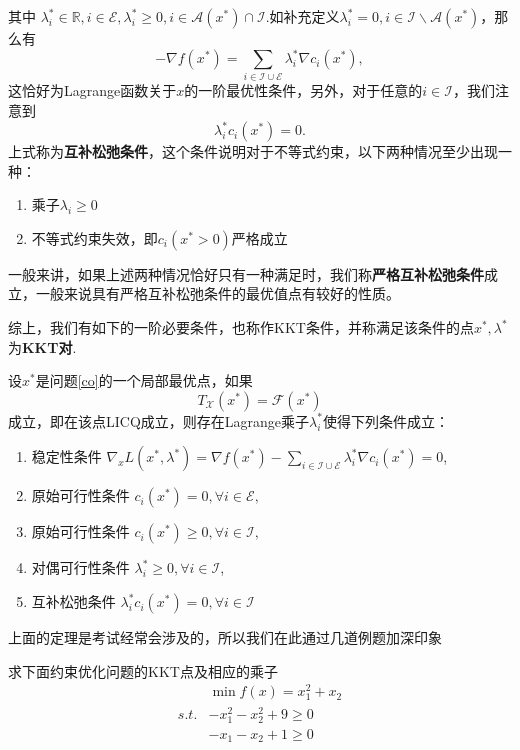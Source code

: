 其中 $\lambda_i^*\in\mathbb{R}, i\in \mathcal{E},\lambda_i^*\geq 0, i\in \mathcal{A}(x^*)\cap\mathcal{I}$.如补充定义$\lambda_i^*=0,i\in \mathcal{I}\backslash\mathcal{A}(x^*)$，那么有
\begin{equation*}
	-\nabla f(x^*) = \sum\limits_{i\in\mathcal{I}\cup\mathcal{E}}\lambda_i^*\nabla c_i(x^*),
\end{equation*}
这恰好为Lagrange函数关于$x$的一阶最优性条件，另外，对于任意的$i\in \mathcal{I}$，我们注意到
\begin{equation*}
	\lambda_i^*c_i(x^*) = 0.
\end{equation*}
上式称为\textbf{互补松弛条件}，这个条件说明对于不等式约束，以下两种情况至少出现一种：
\begin{enumerate}
	\item 乘子$\lambda_i\geq 0$
	\item 不等式约束失效，即$c_i(x^*>0)$严格成立
\end{enumerate}
一般来讲，如果上述两种情况恰好只有一种满足时，我们称\textbf{严格互补松弛条件}成立，一般来说具有严格互补松弛条件的最优值点有较好的性质。\par
综上，我们有如下的一阶必要条件，也称作KKT条件，并称满足该条件的点$x^*, \lambda^*$为\textbf{KKT对}.
\begin{theorem}
	设$x^*$是问题\ref{co}的一个局部最优点，如果
	\begin{equation*}
		T_{\mathcal{X}}(x^*) = \mathcal{F}(x^*)
	\end{equation*}
	成立，即在该点LICQ成立，则存在Lagrange乘子$\lambda_i^*$使得下列条件成立：
	\begin{enumerate}
		\item 稳定性条件 $\nabla_x L(x^*, \lambda^*) = \nabla f(x^*)-\sum\limits_{i\in \mathcal{I}\cup \mathcal{E}}\lambda_i^*\nabla c_i(x^*) = 0$,
		\item 原始可行性条件 $c_i(x^*) = 0,\forall i\in\mathcal{E},$
		\item 原始可行性条件 $c_i(x^*) \geq 0,\forall i\in\mathcal{I},$
		\item 对偶可行性条件 $\lambda_i^*\geq 0,\forall i\in \mathcal{I}$,
		\item 互补松弛条件 $\lambda_i^*c_i(x^*) = 0,\forall i\in \mathcal{I}$
	\end{enumerate}
\end{theorem}
上面的定理是考试经常会涉及的，所以我们在此通过几道例题加深印象
\begin{example}
	求下面约束优化问题的KKT点及相应的乘子
	\begin{equation*}
		\begin{split}
			&\min f(x)=x_1^2+x_2\\
			s.t. & -x_1^2-x_2^2+9\geq 0\\
			& -x_1-x_2+1\geq 0
		\end{split}
	\end{equation*}
\end{example}
